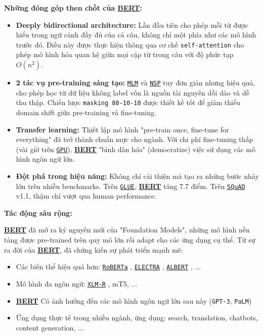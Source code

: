 \textbf{Những đóng góp then chốt của \hyperref[acro:bert]{\textbf{BERT}}:}
\begin{itemize}
    \item \textbf{Deeply bidirectional architecture:} Lần đầu tiên cho phép mỗi từ được hiểu trong ngữ cảnh đầy đủ của cả câu, không chỉ một phía như các mô hình trước đó. Điều này được thực hiện thông qua cơ chế \texttt{self-attention} cho phép mô hình hóa quan hệ giữa mọi cặp từ trong câu với độ phức tạp $O(n^2)$.
    
    \item \textbf{2 tác vụ pre-training sáng tạo:} \hyperref[acro:mlm]{\texttt{MLM}} và \hyperref[acro:nsp]{\texttt{NSP}} tuy đơn giản nhưng hiệu quả, cho phép học từ dữ liệu không label vốn là nguồn tài nguyên dồi dào và dễ thu thập. Chiến lược \texttt{masking 80-10-10} được thiết kế tốt để giảm thiểu domain shift giữa pre-training và fine-tuning.
    
    \item \textbf{Transfer learning:} Thiết lập mô hình "pre-train once, fine-tune for everything" đã trở thành chuẩn mực cho ngành. Với chi phí fine-tuning thấp (vài giờ trên \hyperref[acro:gpu]{\texttt{GPU}}), \hyperref[acro:bert]{\textbf{BERT}} "bình dân hóa" (democratize) việc sử dụng các mô hình ngôn ngữ lớn.
    
    \item \textbf{Đột phá trong hiệu năng:} Không chỉ cải thiện mà tạo ra những bước nhảy lớn trên nhiều benchmarks. Trên \hyperref[acro:glue]{\texttt{GLUE}}, \hyperref[acro:bert]{\textbf{BERT}} tăng 7.7 điểm. Trên \hyperref[acro:squad]{\texttt{SQuAD}} v1.1, thậm chí vượt qua human performance.
\end{itemize}

\textbf{Tác động sâu rộng:}

\hyperref[acro:bert]{\textbf{BERT}} đã mở ra kỷ nguyên mới của "Foundation Models", những mô hình nền tảng được pre-trained trên quy mô lớn rồi adapt cho các ứng dụng cụ thể. Từ sự ra đời của \hyperref[acro:bert]{\textbf{BERT}}, đã chứng kiến sự phát triển mạnh mẽ:

\begin{itemize}
    \item Các biến thể hiệu quả hơn: \hyperref[acro:roberta]{\texttt{RoBERTa}} \cite{liu2019roberta}, \hyperref[acro:electra]{\texttt{ELECTRA}} \cite{clark2020electra}, \hyperref[acro:albert]{\texttt{ALBERT}} \cite{lan2019albert}, ...
    \item Mô hình đa ngôn ngữ: \hyperref[acro:xlm-r]{\texttt{XLM-R}} \cite{conneau2019unsupervised}, mT5, ...
    \item \hyperref[acro:bert]{\textbf{BERT}} Có ảnh hưởng đến các mô hình ngôn ngữ lớn sau này (\texttt{GPT-3}, \texttt{PaLM})
    \item Ứng dụng thực tế trong nhiều ngành, ứng dụng: search, translation, chatbots, content generation, ...
\end{itemize}

